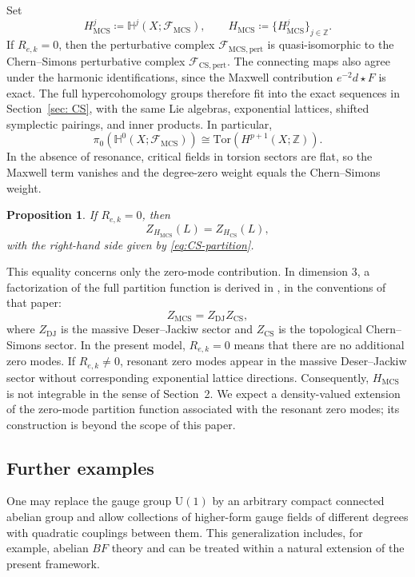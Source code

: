 \documentclass[12pt]{amsart}
\numberwithin{table}{section}
\numberwithin{equation}{section}
\newtheorem{prop}{Proposition}[section]
\theoremstyle{plain}
\newcommand{\sF}{\mathcal{F}}
\newcommand{\Hq}{\mathbb{H}}
\newcommand{\Z}{\mathbb{Z}}
\newcommand{\U}{\mathrm{U}}
\newcommand{\Tor}{\mathrm{Tor}}
\begin{document}
Set
\[
H_{\mathrm{MCS}}^j\coloneq\mathbb H^j(X;\sF_{\mathrm{MCS}}),
\qquad H_{\mathrm{MCS}}\coloneq\{H_{\mathrm{MCS}}^j\}_{j\in\Z}.
\]
If $R_{e,k}=0$, then the perturbative complex $\sF_{\mathrm{MCS},\mathrm{pert}}$ is quasi-isomorphic to the Chern--Simons perturbative complex $\sF_{\mathrm{CS},\mathrm{pert}}$. The connecting maps also agree under the harmonic identifications, since the Maxwell contribution $e^{-2}d\star F$ is exact. The full hypercohomology groups therefore fit into the exact sequences in Section~\ref{sec: CS}, with the same Lie algebras, exponential lattices, shifted symplectic pairings, and inner products. In particular,
\[
\pi_0(\Hq^0(X;\sF_{\mathrm{MCS}}))
\cong\Tor(H^{p+1}(X;\Z)).
\]
In the absence of resonance, critical fields in torsion sectors are flat, so the Maxwell term vanishes and the degree-zero weight equals the Chern--Simons weight. 
\begin{prop}
	If $R_{e,k}=0$, then
	\begin{equation*}%
		Z_{H_{\mathrm{MCS}}}(L)=Z_{H_{\mathrm{CS}}}(L),
	\end{equation*}
	with the right-hand side given by \eqref{eq:CS-partition}.
\end{prop}
This equality concerns only the zero-mode contribution. In dimension $3$, a factorization of the full partition function is derived in \cite[Eq.~(14)]{Armoni2023}, in the conventions of that paper:
\[
Z_{\mathrm{MCS}}=Z_{\mathrm{DJ}}Z_{\mathrm{CS}},
\]
where $Z_{\mathrm{DJ}}$ is the massive Deser--Jackiw sector \cite{DeserJackiw} and $Z_{\mathrm{CS}}$ is the topological Chern--Simons sector. In the present model, $R_{e,k}=0$ means that there are no additional zero modes. If $R_{e,k}\neq0$, resonant zero modes appear in the massive Deser--Jackiw sector without corresponding exponential lattice directions. Consequently, $H_{\mathrm{MCS}}$ is not integrable in the sense of Section~2. We expect a density-valued extension of the zero-mode partition function associated with the resonant zero modes; its construction is beyond the scope of this paper.

\subsection{Further examples}

One may replace the gauge group $\U(1)$ by an arbitrary compact connected abelian group and allow collections of higher-form gauge fields of different degrees with quadratic couplings between them. This generalization includes, for example, abelian $BF$ theory and can be treated within a natural extension of the present framework.
\end{document}
